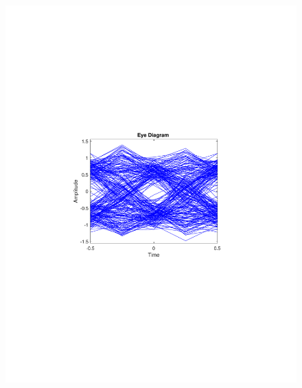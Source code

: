 \begin{refsection}
\begin{figure}[H]
\begin{minipage}{0.30\textwidth}
		\includegraphics[clip, trim=4cm 8cm 4cm 8cm, width=1\textwidth]{./sdf/m_qam_system/figures/expResults/intradyne/4_eye_4GBdInSig13dB_AfFE.pdf}
		\label{fig:4GBdSpecFE2}
	\end{minipage}
	\begin{minipage}{0.30\textwidth}
		\centering

\end{minipage}
\end{figure}
\end{refsection}
